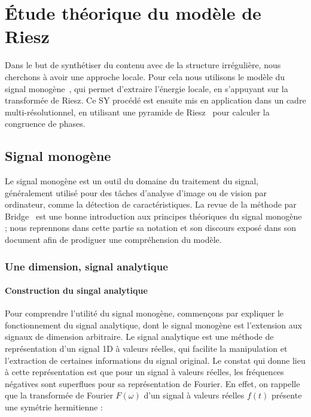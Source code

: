 \chapter[Modèle de Riesz]{Étude théorique du modèle de Riesz} %
\label{chap:chapitre3}

Dans le but de synthétiser du contenu avec de la structure irrégulière, nous cherchons à avoir une approche locale. Pour cela nous utilisons le modèle du signal monogène~\cite{felsberg_monogenic_2001}, qui permet d'extraire l'énergie locale, en s'appuyant sur la transformée de Riesz. Ce SY procédé est ensuite mis en application dans un cadre multi-résolutionnel, en utilisant une pyramide de Riesz~\cite{wadhwa_riesz_2014} pour calculer la congruence de phases.

\section{Signal monogène}

Le signal monogène est un outil du domaine du traitement du signal, généralement utilisé pour des tâches d'analyse d'image ou de vision par ordinateur, comme la détection de caractéristiques. La revue de la méthode par Bridge~\cite{bridge_introduction_2018} est une bonne introduction aux principes théoriques du signal monogène ; nous reprennons dans cette partie sa notation et son discours exposé dans son document afin de prodiguer une compréhension du modèle.

\subsection{Une dimension, signal analytique}

\subsubsection{Construction du singal analytique}

Pour comprendre l'utilité du signal monogène, commençons par expliquer le fonctionnement du signal analytique, dont le signal monogène est l'extension aux signaux de dimension arbitraire. Le signal analytique est une méthode de représentation d'un signal 1D à valeurs réelles, qui facilite la manipulation et l'extraction de certaines informations du signal original. Le constat qui donne lieu à cette représentation est que pour un signal à valeurs réelles, les fréquences négatives sont superflues pour sa représentation de Fourier. En effet, on rappelle que la transformée de Fourier $F(\omega)$ d'un signal à valeurs réelles $f(t)$ présente une symétrie hermitienne :

